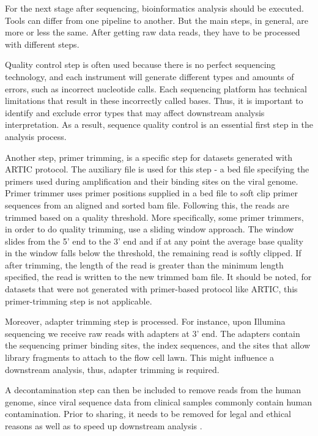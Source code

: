         For the next stage after sequencing, bioinformatics analysis should be executed. Tools can differ from one pipeline to another. But the main steps, in general, are more or less the same. After getting raw data reads, they have to be processed with different steps. 

        Quality control step is often used because there is no perfect sequencing technology, and each instrument will generate different types and amounts of errors, such as incorrect nucleotide calls. Each sequencing platform has technical limitations that result in these incorrectly called bases. Thus, it is important to identify and exclude error types that may affect downstream analysis interpretation. As a result, sequence quality control is an essential first step in the analysis process. 
        
        Another step, primer trimming, is a specific step for datasets generated with ARTIC protocol. The auxiliary file is used for this step - a \acrshort{bed} file specifying the primers used during amplification and their binding sites on the viral genome. Primer trimmer uses primer positions supplied in a \acrshort{bed} file to soft clip primer sequences from an aligned and sorted \acrshort{bam} file. Following this, the reads are trimmed based on a quality threshold. More specifically, some primer trimmers, in order to do quality trimming, use a sliding window approach. The window slides from the 5' end to the 3' end and if at any point the average base quality in the window falls below the threshold, the remaining read is softly clipped. If after trimming, the length of the read is greater than the minimum length specified, the read is written to the new trimmed \acrshort{bam} file. It should be noted, for datasets that were not generated with primer-based protocol like ARTIC, this primer-trimming step is not applicable.
        
        Moreover, adapter trimming step is processed. For instance, upon Illumina sequencing we receive raw reads with adapters at 3’ end. The adapters contain the sequencing primer binding sites, the index sequences, and the sites that allow library fragments to attach to the flow cell lawn. This might influence a downstream analysis, thus, adapter trimming is required. 
        
        A decontamination step can then be included to remove reads from the human genome, since viral sequence data from clinical samples commonly contain human contamination. Prior to sharing, it needs to be removed for legal and ethical reasons as well as to speed up downstream analysis \cite{hunt2022}.
        
